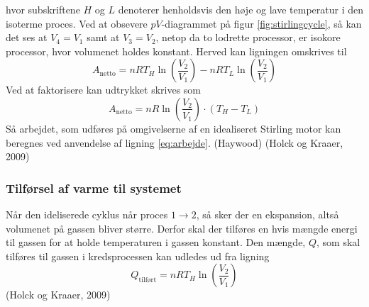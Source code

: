 \documentclass[SRC.tex]{subfiles}
\begin{document}
	hvor subskriftene \(H\) og \(L\) denoterer henholdsvis den høje og lave temperatur i den isoterme
	proces. Ved at obsevere \(pV\)-diagrammet på figur \ref{fig:stirlingcycle}, så kan det ses at \(V_4 = V_1\) samt 
	at \(V_3 = V_2\), netop da to lodrette processor, er isokore processor, hvor volumenet holdes konstant. Herved kan ligningen omskrives til
	\begin{equation}
	A_{\text{netto}} = nRT_H\ln\left(\frac{V_2}{V_1}\right)-nRT_L\ln\left(\frac{V_2}{V_1}\right)
	\end{equation}
	Ved at faktorisere kan udtrykket skrives som
	\begin{equation}
		A_{\text{netto}}= nR\ln\left(\frac{V_2}{V_1}\right)\cdot (T_H - T_L)
		\label{eq:arbejde}
	\end{equation}
	Så arbejdet, som udføres på omgivelserne af en idealiseret Stirling motor kan beregnes ved anvendelse af ligning \eqref{eq:arbejde}.
	(Haywood) (Holck og Kraaer, 2009) 
	
	\subsubsection{Tilførsel af varme til systemet}
	Når den ideliserede cyklus når proces \(1 \rightarrow 2\), så sker der en 
	ekspansion, altså volumenet på gassen bliver større. Derfor skal der tilføres en hvis mængde 
	energi til gassen for at holde temperaturen i gassen konstant. Den mængde, \(Q\), som skal tilføres til gassen i kredsprocessen kan udledes ud fra ligning
	\begin{equation}
		Q_{\text{tilført}} = nRT_H\ln\left(\frac{V_2}{V_1}\right)
		\label{eq:varme}
	\end{equation}
	(Holck og Kraaer, 2009) 
	 
\end{document}
